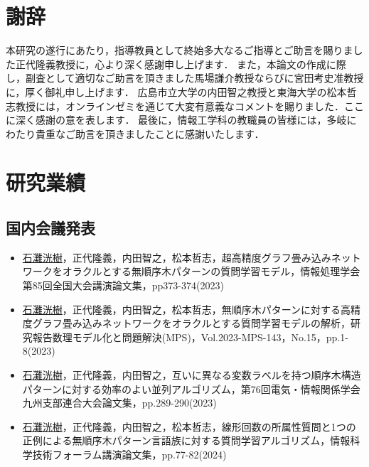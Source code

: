\documentclass[10.5pt, a4paper]{jreport} %
\theoremstyle{definition}
\begin{document}
\begin{spacing}{1.3} %















\chapter*{謝辞}
\thispagestyle{empty}
本研究の遂行にあたり，指導教員として終始多大なるご指導とご助言を賜りました正代隆義教授に，心より深く感謝申し上げます．
また，本論文の作成に際し，副査として適切なご助言を頂きました馬場謙介教授ならびに宮田考史准教授に，厚く御礼申し上げます．
広島市立大学の内田智之教授と東海大学の松本哲志教授には，オンラインゼミを通じて大変有意義なコメントを賜りました．ここに深く感謝の意を表します．
最後に，情報工学科の教職員の皆様には，多岐にわたり貴重なご助言を頂きましたことに感謝いたします．

\chapter*{研究業績}
\thispagestyle{empty}

\section*{国内会議発表}
\begin{itemize}
  \item \uline{石灘洸樹}，正代隆義，内田智之，松本哲志，超高精度グラフ畳み込みネットワークをオラクルとする無順序木パターンの質問学習モデル，情報処理学会 第85回全国大会講演論文集，pp373-374(2023)
  \item \uline{石灘洸樹}，正代隆義，内田智之，松本哲志，無順序木パターンに対する高精度グラフ畳み込みネットワークをオラクルとする質問学習モデルの解析，研究報告数理モデル化と問題解決(MPS)，Vol.2023-MPS-143，No.15，pp.1-8(2023)
  \item \uline{石灘洸樹}，正代隆義，内田智之，互いに異なる変数ラベルを持つ順序木構造パターンに対する効率のよい並列アルゴリズム，第76回電気・情報関係学会九州支部連合大会論文集，pp.289-290(2023)
  \item \uline{石灘洸樹}，正代隆義，内田智之，松本哲志，線形回数の所属性質問と1つの正例による無順序木パターン言語族に対する質問学習アルゴリズム，情報科学技術フォーラム講演論文集，pp.77-82(2024)
\end{itemize}

\end{spacing}
\end{document}
